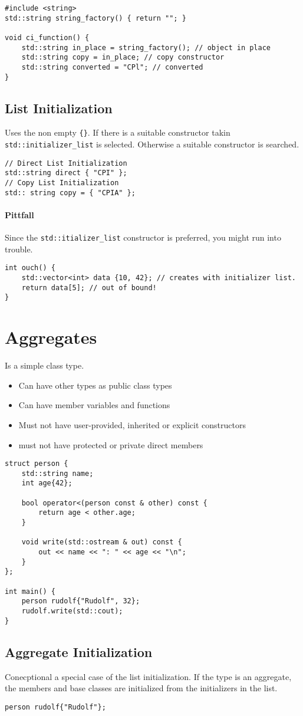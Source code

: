 \begin{lstlisting}
#include <string>
std::string string_factory() { return ""; }

void ci_function() {
	std::string in_place = string_factory(); // object in place
	std::string copy = in_place; // copy constructor
	std::string converted = "CPl"; // converted
}
\end{lstlisting}

\subsection{List Initialization}
Uses the non empty \lstinline|{}|. If there is a suitable constructor takin \lstinline|std::initializer_list| is selected. Otherwise a suitable constructor is searched.
\begin{lstlisting}
// Direct List Initialization
std::string direct { "CPI" };
// Copy List Initialization
std:: string copy = { "CPIA" };
\end{lstlisting}

\paragraph{Pittfall}
Since the \lstinline|std::itializer_list| constructor is preferred, you might run into trouble.
\begin{lstlisting}
int ouch() {
	std::vector<int> data {10, 42}; // creates with initializer list.
	return data[5]; // out of bound!
}
\end{lstlisting}

\section{Aggregates}
Is a simple class type. 
\begin{itemize}
	\itemsep -0.5em
	\item Can have other types as public class types
	\item Can have member variables and functions
	\item Must not have user-provided, inherited or explicit constructors
	\item must not have protected or private direct members
\end{itemize}

\begin{lstlisting}
struct person {
	std::string name;
	int age{42};

	bool operator<(person const & other) const {
		return age < other.age;
	}

	void write(std::ostream & out) const {
		out << name << ": " << age << "\n"; 
	}
};

int main() {
	person rudolf{"Rudolf", 32};
	rudolf.write(std::cout); 
}
\end{lstlisting}

\subsection{Aggregate Initialization}
Conecptional a special case of the list initialization. If the type is an aggregate, the members and base classes are initialized from the initializers in the list. 

\begin{lstlisting}
person rudolf{"Rudolf"};
\end{lstlisting}

